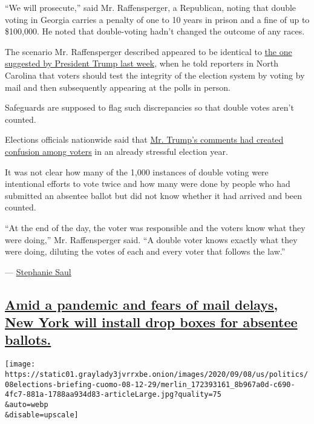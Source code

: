 ``We will prosecute,'' said Mr. Raffensperger, a Republican, noting that
double voting in Georgia carries a penalty of one to 10 years in prison
and a fine of up to \$100,000. He noted that double-voting hadn't
changed the outcome of any races.

The scenario Mr. Raffensperger described appeared to be identical to
\href{https://www.nytimes3xbfgragh.onion/2020/09/02/us/politics/trump-people-vote-twice.html}{the
one suggested by President Trump last week}, when he told reporters in
North Carolina that voters should test the integrity of the election
system by voting by mail and then subsequently appearing at the polls in
person.

Safeguards are supposed to flag such discrepancies so that double votes
aren't counted.

Elections officials nationwide said that
\href{https://www.nytimes3xbfgragh.onion/2020/09/03/us/politics/people-voting-twice-trump.html}{Mr.
Trump's comments had created confusion among voters} in an already
stressful election year.

It was not clear how many of the 1,000 instances of double voting were
intentional efforts to vote twice and how many were done by people who
had submitted an absentee ballot but did not know whether it had arrived
and been counted.

``At the end of the day, the voter was responsible and the voters know
what they were doing,'' Mr. Raffensperger said. ``A double voter knows
exactly what they were doing, diluting the votes of each and every voter
that follows the law.''

---
\href{https://www.nytimes3xbfgragh.onion/by/stephanie-saul}{Stephanie
Saul}

\hypertarget{amid-a-pandemic-and-fears-of-mail-delays-new-york-will-install-drop-boxes-for-absentee-ballots}{%
\subsection{\texorpdfstring{\protect\hyperlink{amid-a-pandemic-and-fears-of-mail-delays-new-york-will-install-drop-boxes-for-absentee-ballots}{Amid
a pandemic and fears of mail delays, New York will install drop boxes
for absentee
ballots.}}{Amid a pandemic and fears of mail delays, New York will install drop boxes for absentee ballots.}}\label{amid-a-pandemic-and-fears-of-mail-delays-new-york-will-install-drop-boxes-for-absentee-ballots}}

\texttt{[image: https://static01.graylady3jvrrxbe.onion/images/2020/09/08/us/politics/08elections-briefing-cuomo-08-12-29/merlin\_172393161\_8b967a0d-c690-4fc7-881a-1788aa934d83-articleLarge.jpg?quality=75\\\&auto=webp\\\&disable=upscale]}

